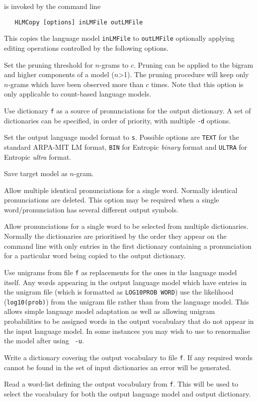  is invoked by the command line
\begin{verbatim}
   HLMCopy [options] inLMFile outLMFile
\end{verbatim}
This copies the language model {\tt inLMFile} to {\tt outLMFile} optionally
applying editing operations controlled by the following options.
\begin{optlist}

   Set the pruning threshold for $n$-grams to $c$. 
	Pruning can be applied to the bigram and higher
	components of a model ($n$>1). The pruning procedure will keep only 
	$n$-grams which have been observed more than $c$ times. Note
	that this option is only applicable to count-based language 
        models.

   Use dictionary {\tt f} as a source of pronunciations
        for the output dictionary. A set of dictionaries can be
        specified, in order of priority, with multiple {\tt -d}
        options.
  
   Set the output language model format to {\tt s}.
        Possible options are {\tt TEXT} for the standard ARPA-MIT
	LM format, {\tt BIN} for Entropic {\em binary} format and 
        {\tt ULTRA} for Entropic {\em ultra} format.
        
   Save target model as $n$-gram.

   Allow multiple identical pronunciations for a single
	word.  Normally identical pronunciations are deleted.  This
	option may be required when a single word/pronunciation has
	several different output symbols.

   Allow pronunciations for a single word to be selected
	from multiple dictionaries.  Normally the dictionaries are
	prioritised by the order they appear on the command line with
	only entries in the first dictionary containing a
	pronunciation for a particular word being copied to the output
	dictionary.

   Use unigrams from file {\tt f} as replacements for the
	ones in the language model itself.  Any words appearing in the
	output language model which have entries in the unigram file
	(which is formatted as {\tt LOG10PROB WORD}) use the
	likelihood ({\tt log10(prob)}) from the unigram file rather
	than from the language model.  This allows simple language
	model adaptation as well as allowing unigram probabilities to
	be assigned words in the output vocabulary that do not appear
	in the input language model.  In some instances you may wish
	to use  to renormalise the model after using {\tt
	-u}.

    Write a dictionary covering the output vocabulary to
	file {\tt f}.  If any required words cannot be found in the
	set of input dictionaries an error will be generated.

   Read a word-list defining the output vocabulary from
	{\tt f}. This will be used to select the vocabulary for both
	the output language model and output dictionary.

\end{optlist}

